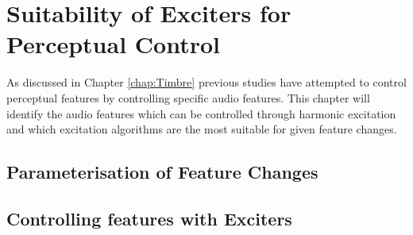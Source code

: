 
\chapter{Suitability of Exciters for Perceptual Control} %
\label{chap:FeatureControl}
	As discussed in Chapter \ref{chap:Timbre} previous studies have attempted to control perceptual features by 
	controlling specific audio features. This chapter will identify the audio features which can be controlled through 
	harmonic excitation and which excitation algorithms are the most suitable for given feature changes.

\section{Parameterisation of Feature Changes}
\label{sec:FeatureControl-Parameterisation}

\section{Controlling features with Exciters}
\label{sec:FeatureControl-Control}
